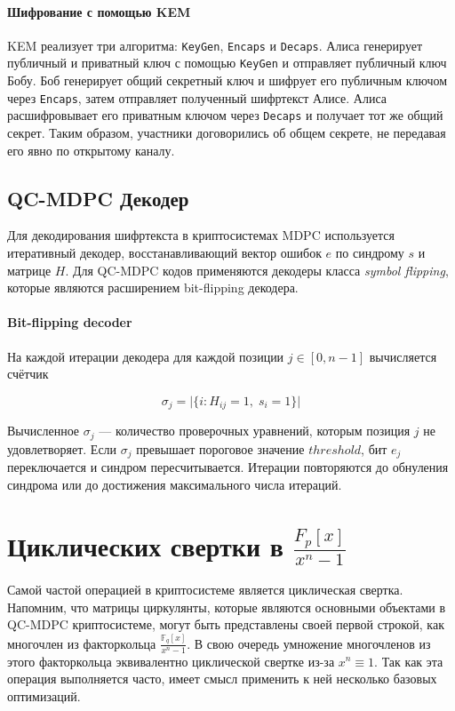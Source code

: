 \documentclass[14pt]{mmcs_article}
\theoremstyle{break}
\begin{document}
\paragraph{Шифрование с помощью KEM} KEM реализует три алгоритма: \texttt{KeyGen}, \texttt{Encaps} и \texttt{Decaps}. Алиса генерирует публичный и приватный ключ с помощью \texttt{KeyGen} и отправляет публичный ключ Бобу. Боб генерирует общий секретный ключ и шифрует его публичным ключом через \texttt{Encaps}, затем отправляет полученный шифртекст Алисе. Алиса расшифровывает его приватным ключом через \texttt{Decaps} и получает тот же общий секрет. Таким образом, участники договорились об общем секрете, не передавая его явно по открытому каналу.

\subsection{QC-MDPC Декодер}

Для декодирования шифртекста в криптосистемах MDPC используется итеративный декодер, восстанавливающий вектор ошибок $e$ по синдрому $s$ и матрице $H$. Для QC-MDPC кодов применяются декодеры класса \emph{symbol flipping}, которые являются расширением bit-flipping декодера.

\paragraph{Bit-flipping decoder}

На каждой итерации декодера для каждой позиции $j \in [0, n - 1]$ вычисляется счётчик

\begin{equation}
    \sigma_j = \bigl|\{ i : H_{ij} = 1,\; s_i = 1 \}\bigr|
\end{equation}

Вычисленное $\sigma_j$ --- количество проверочных уравнений, которым позиция $j$ не удовлетворяет. Если $\sigma_j$ превышает пороговое значение $threshold$, бит $e_j$ переключается и синдром пересчитывается. Итерации повторяются до обнуления синдрома или до достижения максимального числа итераций.

\section{Циклических свертки в $\frac{F_p[x]}{x^n - 1}$}
\label{sec3}

Самой частой операцией в криптосистеме является циклическая свертка. Напомним, что матрицы циркулянты, которые являются основными объектами в QC-MDPC криптосистеме, могут быть представлены своей первой строкой, как многочлен из факторкольца $\frac{\mathbb{F}_q[x]}{x^n - 1}$. В свою очередь умножение многочленов из этого факторкольца эквивалентно циклической свертке из-за $x^n \equiv 1$. Так как эта операция выполняется часто, имеет смысл применить к ней несколько базовых оптимизаций.
\end{document}
